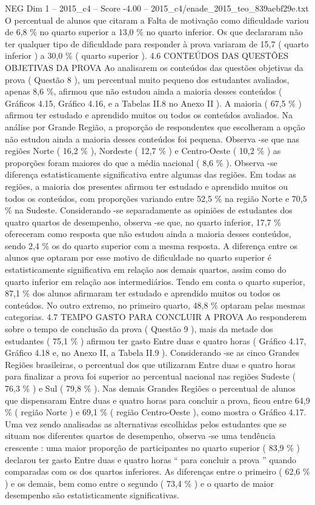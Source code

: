 \begin{textsample}{NEG Dim 1 – 2015\_c4 – Score -4.00 – 2015\_c4/enade\_2015\_teo\_839aebf29e.txt}
O percentual de alunos que citaram a Falta de motivação como dificuldade variou de 6,8 \% no quarto superior a 13,0 \% no quarto inferior.
Os que declararam não ter qualquer tipo de dificuldade para responder à prova variaram de 15,7 ( quarto inferior ) a 30,0 \% ( quarto superior ). 4.6 CONTEÚDOS DAS QUESTÕES OBJETIVAS DA PROVA Ao analisarem os conteúdos das questões objetivas da prova ( Questão 8 ), um percentual muito pequeno dos estudantes avaliados, apenas 8,6 \%, afirmou que não estudou ainda a maioria desses conteúdos ( Gráficos 4.15, Gráfico 4.16, e a Tabelas II.8 no Anexo II ).
A maioria ( 67,5 \% ) afirmou ter estudado e aprendido muitos ou todos os conteúdos avaliados.
Na análise por Grande Região, a proporção de respondentes que escolheram a opção não estudou ainda a maioria desses conteúdos foi pequena.
Observa -se que nas regiões Norte ( 16,2 \% ), Nordeste ( 12,7 \% ) e Centro-Oeste ( 10,2 \% ) as proporções foram maiores do que a média nacional ( 8,6 \% ).
Observa -se diferença estatisticamente significativa entre algumas das regiões.
Em todas as regiões, a maioria dos presentes afirmou ter estudado e aprendido muitos ou todos os conteúdos, com proporções variando entre 52,5 \% na região Norte e 70,5 \% na Sudeste.
Considerando -se separadamente as opiniões de estudantes dos quatro quartos de desempenho, observa -se que, no quarto inferior, 17,7 \% ofereceram como resposta que não estudou ainda a maioria desses conteúdos, sendo 2,4 \% os do quarto superior com a mesma resposta.
A diferença entre os alunos que optaram por esse motivo de dificuldade no quarto superior é estatisticamente significativa em relação aos demais quartos, assim como do quarto inferior em relação aos intermediários.
Tendo em conta o quarto superior, 87,1 \% dos alunos afirmaram ter estudado e aprendido muitos ou todos os conteúdos.
No outro extremo, no primeiro quarto, 48,8 \% optaram pelas mesmas categorias. 4.7 TEMPO GASTO PARA CONCLUIR A PROVA Ao responderem sobre o tempo de conclusão da prova ( Questão 9 ), mais da metade dos estudantes ( 75,1 \% ) afirmou ter gasto Entre duas e quatro horas ( Gráfico 4.17, Gráfico 4.18 e, no Anexo II, a Tabela II.9 ).
Considerando -se as cinco Grandes Regiões brasileiras, o percentual dos que utilizaram Entre duas e quatro horas para finalizar a prova foi superior ao percentual nacional nas regiões Sudeste ( 76,3 \% ) e Sul ( 79,8 \% ).
Nas demais Grandes Regiões o percentual de alunos que dispensaram Entre duas e quatro horas para concluir a prova, ficou entre 64,9 \% ( região Norte ) e 69,1 \% ( região Centro-Oeste ), como mostra o Gráfico 4.17.
Uma vez sendo analisadas as alternativas escolhidas pelos estudantes que se situam nos diferentes quartos de desempenho, observa -se uma tendência crescente : uma maior proporção de participantes no quarto superior ( 83,9 \% ) declarou ter gasto Entre duas e quatro horas “ para concluir a prova ” quando comparadas com os dos quartos inferiores.
As diferenças entre o primeiro ( 62,6 \% ) e os demais, bem como entre o segundo ( 73,4 \% ) e o quarto de maior desempenho são estatisticamente significativas.

\end{textsample}
